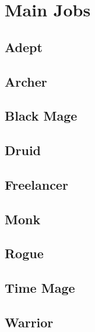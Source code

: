 \section{Main Jobs}
\label{sec:jobs-pjob}

\subsection{Adept}


\subsection{Archer}


%

\subsection{Black Mage}


\subsection{Druid}


\subsection{Freelancer}


\subsection{Monk}


\subsection{Rogue}


\subsection{Time Mage}


\subsection{Warrior}


